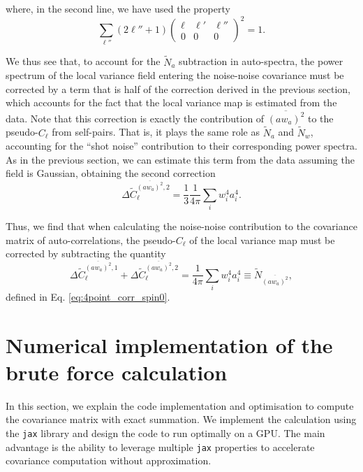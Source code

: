 \documentclass[%
 reprint,
superscriptaddress,
nofootinbib,
 amsmath,amssymb,
 aps,
 prd,
]{revtex4-2}
\newcommand{\wtj}[6]{\left(\begin{array}{ccc} #1 & #2 & #3\\#4 & #5 & #6\end{array} \right)}
\begin{document}
    where, in the second line, we have used the property
    \begin{equation}
      \sum_{\ell''}(2\ell''+1)\wtj{\ell}{\ell'}{\ell''}{0}{0}{0}^2=1.
    \end{equation}

    We thus see that, to account for the $\tilde{N}_a$ subtraction in auto-spectra, the power spectrum of the local variance field entering the noise-noise covariance must be corrected by a term that is half of the correction derived in the previous section, which accounts for the fact that the local variance map is estimated from the data. Note that this correction is exactly the contribution of $\overline{(aw_a)^2}$ to the pseudo-$C_\ell$ from self-pairs. That is, it plays the same role as $\tilde{N}_a$ and $\tilde{N}_w$, accounting for the ``shot noise'' contribution to their corresponding power spectra. As in the previous section, we can estimate this term from the data assuming the field is Gaussian, obtaining the second correction
    \begin{equation}
      \Delta\tilde{C}^{\overline{(aw_a)^2},2}_\ell=\frac{1}{3}\frac{1}{4\pi}\sum_iw_i^4a_i^4.
    \end{equation}

    Thus, we find that when calculating the noise-noise contribution to the covariance matrix of auto-correlations, the pseudo-$C_\ell$ of the local variance map must be corrected by subtracting the quantity
    \begin{equation}
      \Delta\tilde{C}^{\overline{(aw_a)^2},1}_\ell+\Delta\tilde{C}^{\overline{(aw_a)^2},2}_\ell=\frac{1}{4\pi}\sum_iw_i^4a_i^4\equiv\tilde{N}_{\overline{(aw_a)^2}},
    \end{equation}
    defined in Eq. \ref{eq:4point_corr_spin0}.


\section{Numerical implementation of the brute force calculation} \label{app:brute_code}
In this section, we explain the code implementation and optimisation to compute the covariance matrix with exact summation. We implement the calculation using the \texttt{jax} library and design the code to run optimally on a GPU. The main advantage is the ability to leverage multiple \texttt{jax} properties to accelerate covariance computation without approximation.
\end{document}

